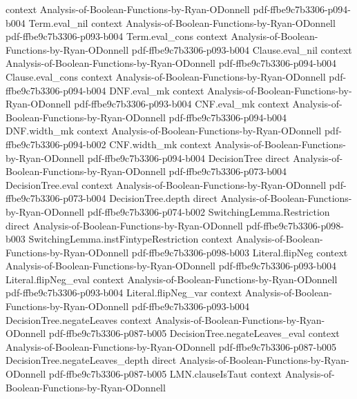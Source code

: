 \begin{theorem}
  {context}
  {Analysis-of-Boolean-Functions-by-Ryan-ODonnell}
  {pdf-ffbe9c7b3306-p094-b004}
\proofstep
  {Term.eval_nil}
  {context}
  {Analysis-of-Boolean-Functions-by-Ryan-ODonnell}
  {pdf-ffbe9c7b3306-p093-b004}
\proofstep
  {Term.eval_cons}
  {context}
  {Analysis-of-Boolean-Functions-by-Ryan-ODonnell}
  {pdf-ffbe9c7b3306-p093-b004}
\proofstep
  {Clause.eval_nil}
  {context}
  {Analysis-of-Boolean-Functions-by-Ryan-ODonnell}
  {pdf-ffbe9c7b3306-p094-b004}
\proofstep
  {Clause.eval_cons}
  {context}
  {Analysis-of-Boolean-Functions-by-Ryan-ODonnell}
  {pdf-ffbe9c7b3306-p094-b004}
\proofstep
  {DNF.eval_mk}
  {context}
  {Analysis-of-Boolean-Functions-by-Ryan-ODonnell}
  {pdf-ffbe9c7b3306-p093-b004}
\proofstep
  {CNF.eval_mk}
  {context}
  {Analysis-of-Boolean-Functions-by-Ryan-ODonnell}
  {pdf-ffbe9c7b3306-p094-b004}
\proofstep
  {DNF.width_mk}
  {context}
  {Analysis-of-Boolean-Functions-by-Ryan-ODonnell}
  {pdf-ffbe9c7b3306-p094-b002}
\proofstep
  {CNF.width_mk}
  {context}
  {Analysis-of-Boolean-Functions-by-Ryan-ODonnell}
  {pdf-ffbe9c7b3306-p094-b004}
\proofstep
  {DecisionTree}
  {direct}
  {Analysis-of-Boolean-Functions-by-Ryan-ODonnell}
  {pdf-ffbe9c7b3306-p073-b004}
\proofstep
  {DecisionTree.eval}
  {context}
  {Analysis-of-Boolean-Functions-by-Ryan-ODonnell}
  {pdf-ffbe9c7b3306-p073-b004}
\proofstep
  {DecisionTree.depth}
  {direct}
  {Analysis-of-Boolean-Functions-by-Ryan-ODonnell}
  {pdf-ffbe9c7b3306-p074-b002}
\proofstep
  {SwitchingLemma.Restriction}
  {direct}
  {Analysis-of-Boolean-Functions-by-Ryan-ODonnell}
  {pdf-ffbe9c7b3306-p098-b003}
\proofstep
  {SwitchingLemma.instFintypeRestriction}
  {context}
  {Analysis-of-Boolean-Functions-by-Ryan-ODonnell}
  {pdf-ffbe9c7b3306-p098-b003}
\proofstep
  {Literal.flipNeg}
  {context}
  {Analysis-of-Boolean-Functions-by-Ryan-ODonnell}
  {pdf-ffbe9c7b3306-p093-b004}
\proofstep
  {Literal.flipNeg_eval}
  {context}
  {Analysis-of-Boolean-Functions-by-Ryan-ODonnell}
  {pdf-ffbe9c7b3306-p093-b004}
\proofstep
  {Literal.flipNeg_var}
  {context}
  {Analysis-of-Boolean-Functions-by-Ryan-ODonnell}
  {pdf-ffbe9c7b3306-p093-b004}
\proofstep
  {DecisionTree.negateLeaves}
  {context}
  {Analysis-of-Boolean-Functions-by-Ryan-ODonnell}
  {pdf-ffbe9c7b3306-p087-b005}
\proofstep
  {DecisionTree.negateLeaves_eval}
  {context}
  {Analysis-of-Boolean-Functions-by-Ryan-ODonnell}
  {pdf-ffbe9c7b3306-p087-b005}
\proofstep
  {DecisionTree.negateLeaves_depth}
  {direct}
  {Analysis-of-Boolean-Functions-by-Ryan-ODonnell}
  {pdf-ffbe9c7b3306-p087-b005}
\proofstep
  {LMN.clauseIsTaut}
  {context}
  {Analysis-of-Boolean-Functions-by-Ryan-ODonnell}

\end{theorem}
